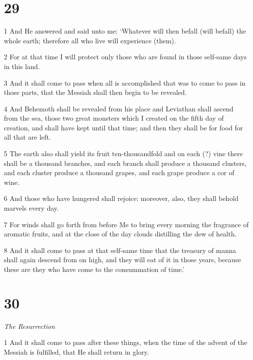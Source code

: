\chapter{29}

\par 1 And He answered and said unto me: ‘Whatever will then befall (will befall) the whole earth; therefore all who live will experience (them). 

\par 2 For at that time I will protect only those who are found in those self-same days in this land. 

\par 3 And it shall come to pass when all is accomplished that was to come to pass in those parts, that the Messiah shall then begin to be revealed. 

\par 4 And Behemoth shall be revealed from his place and Leviathan shall ascend from the sea, those two great monsters which I created on the fifth day of creation, and shall have kept until that time; and then they shall be for food for all that are left. 

\par 5 The earth also shall yield its fruit ten-thousandfold and on each (?) vine there shall be a thousand branches, and each branch shall produce a thousand clusters, and each cluster produce a thousand grapes, and each grape produce a cor of wine. 

\par 6 And those who have hungered shall rejoice: moreover, also, they shall behold marvels every day. 

\par 7 For winds shall go forth from before Me to bring every morning the fragrance of aromatic fruits, and at the close of the day clouds distilling the dew of health. 

\par 8 And it shall come to pass at that self-same time that the treasury of manna shall again descend from on high, and they will eat of it in those years, because these are they who have come to the consummation of time.’

\chapter{30}

\par \textit{The Resurrection}

\par 1 And it shall come to pass after these things, when the time of the advent of the Messiah is fulfilled, that He shall return in glory.

